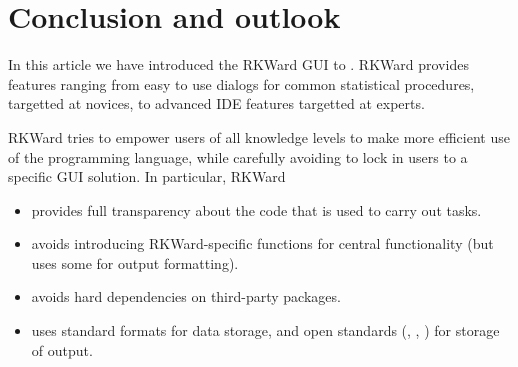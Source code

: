 \section{Conclusion and outlook}
\label{sec:conclusion_summary}
In this article we have introduced the RKWard GUI to . RKWard provides features ranging
from easy to use dialogs for common statistical procedures, targetted at  novices, to advanced
IDE features targetted at  experts.

RKWard tries to empower users of all knowledge levels to make more efficient use of the 
 programming language, while carefully avoiding to lock in users to a specific
GUI solution. In particular, RKWard
\begin{itemize}
 \item provides full transparency about the  code that is used to carry out tasks.
 \item avoids introducing RKWard-specific  functions for central functionality (but uses some for output formatting).
 \item avoids hard dependencies on third-party  packages.
 \item uses standard  formats \citep[cf.][]{RDCT2010c} for data storage, and open standards (, , ) for storage of output.
\end{itemize}

